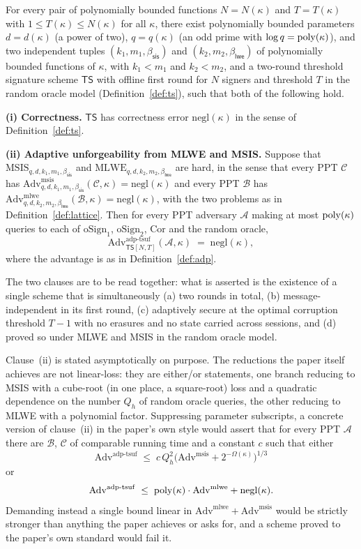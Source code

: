 \documentclass{aicr-conjecture}
\newcommand{\TS}{\mathsf{TS}}
\newcommand{\oSignone}{\mathrm{oSign}_1}
\newcommand{\oSigntwo}{\mathrm{oSign}_2}
\newcommand{\Cor}{\mathrm{Cor}}
\newcommand{\negl}{\mathrm{negl}}
\newcommand{\Adv}{\mathrm{Adv}}
\newcommand{\Advadp}{\Adv^{\mathrm{adp}\text{-}\mathrm{tsuf}}}
\newcommand{\Advmsis}{\Adv^{\mathrm{msis}}}
\newcommand{\Advmlwe}{\Adv^{\mathrm{mlwe}}}
\newcommand{\MSIS}{\mathrm{MSIS}}
\newcommand{\MLWE}{\mathrm{MLWE}}
\newcommand{\bsis}{\beta_{\mathsf{sis}}}
\newcommand{\blwe}{\beta_{\mathsf{lwe}}}
\begin{document}
\begin{conjecture}\label{conj:main}
For every pair of polynomially bounded functions $N = N(\kappa)$ and
$T = T(\kappa)$ with $1 \le T(\kappa) \le N(\kappa)$ for all $\kappa$,
there exist polynomially bounded parameters $d = d(\kappa)$ (a power of
two), $q = q(\kappa)$ (an odd prime with $\log q = \mathrm{poly}(\kappa)$), and
two independent tuples $(k_1, m_1, \bsis)$ and $(k_2, m_2, \blwe)$ of
polynomially bounded functions of $\kappa$, with $k_1 < m_1$ and
$k_2 < m_2$, and a two-round threshold signature scheme $\TS$ with
offline first round for $N$ signers and threshold $T$ in the random
oracle model (Definition~\ref{def:ts}), such that both of the following
hold.

\smallskip\noindent\textbf{(i) Correctness.} $\TS$ has correctness
error $\negl(\kappa)$ in the sense of Definition~\ref{def:ts}.

\smallskip\noindent\textbf{(ii) Adaptive unforgeability from MLWE and
MSIS.} Suppose that $\MSIS_{q,d,k_1,m_1,\bsis}$ and
$\MLWE_{q,d,k_2,m_2,\blwe}$ are hard, in the sense that every PPT
$\mathcal{C}$ has $\Advmsis_{q,d,k_1,m_1,\bsis}(\mathcal{C},\kappa) =
\negl(\kappa)$ and every PPT $\mathcal{B}$ has
$\Advmlwe_{q,d,k_2,m_2,\blwe}(\mathcal{B},\kappa) = \negl(\kappa)$,
with the two problems as in Definition~\ref{def:lattice}. Then for
every PPT adversary $\mathcal{A}$ making at most $\mathrm{poly}(\kappa)$
queries to each of $\oSignone$, $\oSigntwo$, $\Cor$ and the random
oracle,
\[
  \Advadp_{\TS[N,T]}(\mathcal{A},\kappa) \;=\; \negl(\kappa),
\]
where the advantage is as in Definition~\ref{def:adp}.

\smallskip\noindent The two clauses are to be read together: what is
asserted is the existence of a single scheme that is simultaneously
(a) two rounds in total, (b) message-independent in its first round,
(c) adaptively secure at the optimal corruption threshold $T-1$ with no
erasures and no state carried across sessions, and (d) proved so under
MLWE and MSIS in the random oracle model.
\end{conjecture}

\begin{remark}\label{rem:concrete}
Clause~(ii) is stated asymptotically on purpose. The reductions the
paper itself achieves are not linear-loss: they are either/or
statements, one branch reducing to MSIS with a cube-root (in one place,
a square-root) loss and a quadratic dependence on the number $Q_h$ of
random oracle queries, the other reducing to MLWE with a polynomial
factor. Suppressing parameter subscripts, a concrete version of
clause~(ii) in the paper's own style would assert that for every PPT
$\mathcal{A}$ there are $\mathcal{B}$, $\mathcal{C}$ of comparable
running time and a constant $c$ such that either
\[
  \Advadp \;\le\;
    c\,Q_h^{2}\bigl(\Advmsis + 2^{-\Omega(\kappa)}\bigr)^{1/3}
\]
or
\[
  \Advadp \;\le\; \poly(\kappa)\cdot\Advmlwe + \negl(\kappa) .
\]
Demanding instead a single bound linear in
$\Advmlwe + \Advmsis$ would be strictly stronger than anything the
paper achieves or asks for, and a scheme proved to the paper's own
standard would fail it.
\end{remark}
\end{document}

